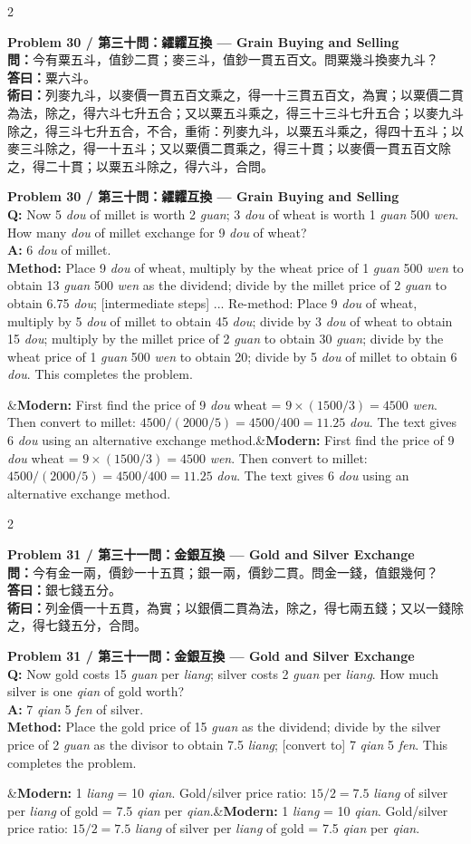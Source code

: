 \documentclass[11pt,a4paper]{article}
\newcommand{\bilingualproblem}[4]{%
  \begin{paracol}{2}
  \begin{leftcolumn}
  \noindent\textbf{\color{problemcolor}#1}\\[0.2cm]
  #2
  \end{leftcolumn}
  \switchcolumn
  \noindent\textbf{\color{problemcolor}#1}\\[0.2cm]
  #3
  \end{paracol}
  \ifx&#4&\else\vspace{0.3cm}\noindent#4\fi
  \vspace{0.5cm}
}
\newcommand{\wen}[1]{\textcolor{problemcolor}{\textbf{問：}}#1}
\newcommand{\da}[1]{\textcolor{answercolor}{\textbf{答曰：}}#1}
\newcommand{\shu}[1]{\textcolor{methodcolor}{\textbf{術曰：}}#1}
\newcommand{\wenen}[1]{\textcolor{problemcolor}{\textbf{Q:}} #1}
\newcommand{\daen}[1]{\textcolor{answercolor}{\textbf{A:}} #1}
\newcommand{\shuen}[1]{\textcolor{methodcolor}{\textbf{Method:}} #1}
\begin{document}
\bilingualproblem{Problem 30 / 第三十問：糴糶互換 --- Grain Buying and Selling}{
\wen{今有粟五斗，值鈔二貫；麥三斗，值鈔一貫五百文。問粟幾斗換麥九斗？}\\[0.2cm]
\da{粟六斗。}\\[0.2cm]
\shu{列麥九斗，以麥價一貫五百文乘之，得一十三貫五百文，為實；以粟價二貫為法，除之，得六斗七升五合；又以粟五斗乘之，得三十三斗七升五合；以麥九斗除之，得三斗七升五合，不合，重術：列麥九斗，以粟五斗乘之，得四十五斗；以麥三斗除之，得一十五斗；又以粟價二貫乘之，得三十貫；以麥價一貫五百文除之，得二十貫；以粟五斗除之，得六斗，合問。}
}{
\wenen{Now 5 \textit{dou} of millet is worth 2 \textit{guan}; 3 \textit{dou} of wheat is worth 1 \textit{guan} 500 \textit{wen}. How many \textit{dou} of millet exchange for 9 \textit{dou} of wheat?}\\[0.2cm]
\daen{6 \textit{dou} of millet.}\\[0.2cm]
\shuen{Place 9 \textit{dou} of wheat, multiply by the wheat price of 1 \textit{guan} 500 \textit{wen} to obtain 13 \textit{guan} 500 \textit{wen} as the dividend; divide by the millet price of 2 \textit{guan} to obtain 6.75 \textit{dou}; [intermediate steps] ... Re-method: Place 9 \textit{dou} of wheat, multiply by 5 \textit{dou} of millet to obtain 45 \textit{dou}; divide by 3 \textit{dou} of wheat to obtain 15 \textit{dou}; multiply by the millet price of 2 \textit{guan} to obtain 30 \textit{guan}; divide by the wheat price of 1 \textit{guan} 500 \textit{wen} to obtain 20; divide by 5 \textit{dou} of millet to obtain 6 \textit{dou}. This completes the problem.}
}{\textbf{Modern:} First find the price of 9 \textit{dou} wheat = $9 \times (1500/3) = 4500$ \textit{wen}. Then convert to millet: $4500 / (2000/5) = 4500/400 = 11.25$ \textit{dou}. The text gives 6 \textit{dou} using an alternative exchange method.}

\bilingualproblem{Problem 31 / 第三十一問：金銀互換 --- Gold and Silver Exchange}{
\wen{今有金一兩，價鈔一十五貫；銀一兩，價鈔二貫。問金一錢，值銀幾何？}\\[0.2cm]
\da{銀七錢五分。}\\[0.2cm]
\shu{列金價一十五貫，為實；以銀價二貫為法，除之，得七兩五錢；又以一錢除之，得七錢五分，合問。}
}{
\wenen{Now gold costs 15 \textit{guan} per \textit{liang}; silver costs 2 \textit{guan} per \textit{liang}. How much silver is one \textit{qian} of gold worth?}\\[0.2cm]
\daen{7 \textit{qian} 5 \textit{fen} of silver.}\\[0.2cm]
\shuen{Place the gold price of 15 \textit{guan} as the dividend; divide by the silver price of 2 \textit{guan} as the divisor to obtain 7.5 \textit{liang}; [convert to] 7 \textit{qian} 5 \textit{fen}. This completes the problem.}
}{\textbf{Modern:} 1 \textit{liang} = 10 \textit{qian}. Gold/silver price ratio: $15/2 = 7.5$ \textit{liang} of silver per \textit{liang} of gold = 7.5 \textit{qian} per \textit{qian}.}
\end{document}
